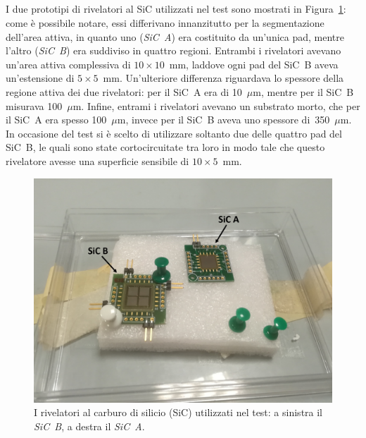 

\subsection{}



I due prototipi di rivelatori al SiC utilizzati nel test sono mostrati in Figura~\ref{fig:sic}: come è possibile notare, essi differivano innanzitutto per la segmentazione dell'area attiva, in quanto uno (\emph{SiC~A}) era costituito da un'unica pad, mentre l'altro (\emph{SiC~B}) era suddiviso in quattro regioni. 
Entrambi i rivelatori avevano un'area attiva complessiva di $10 \times 10$~mm, laddove ogni pad del SiC~B aveva un'estensione di $5 \times 5$~mm.
Un'ulteriore differenza riguardava lo spessore della regione attiva dei due rivelatori: per il SiC~A era di 10~$\mu$m, mentre per il SiC~B misurava 100~$\mu$m.
Infine, entrami i rivelatori avevano un substrato morto, che per il SiC~A era spesso 100~$\mu$m, invece per il SiC~B aveva uno spessore di~350~$\mu$m.
In occasione del test si è scelto di utilizzare soltanto due delle quattro pad del SiC~B, le quali sono state cortocircuitate tra loro in modo tale che questo rivelatore avesse una superficie sensibile di $10 \times 5$~mm.



\begin{figure} [!p]
	\centering
	\includegraphics[scale=0.42]{Grafici/sic_etichette.png}
	\caption{I rivelatori al carburo di silicio (SiC) utilizzati nel test: a sinistra il \emph{SiC~B}, a destra il \emph{SiC~A}.} \label{fig:sic}
\end{figure}

